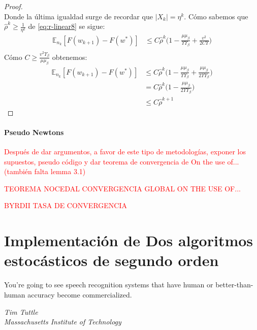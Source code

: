 \documentclass{book}
\theoremstyle{plain}
\theoremstyle{definition}
\theoremstyle{remark}
\begin{document}
\begin{proof}
\begin{equation}
\end{equation}
Donde la última igualdad surge de recordar que $|X_k|=\eta^k$. Cómo sabemos que $\hat{\rho}^k \geq \frac{1}{\eta^k}$ de \ref{eq:r-linear8} se sigue:
\begin{equation}\label{eq:r-linear9}
    \begin{split}
        \mathbb{E}_{n_k}[F(w_{k+1})- F(w^*)] & \leq C\hat{\rho}^k\bigg(1 -\frac{\mu\mu_\beta}{\Upsilon\Upsilon_\beta}+ \frac{v^2}{2C\Upsilon}\bigg)\\
    \end{split}
\end{equation}
Cómo $C \geq \frac{v^2\Upsilon_\beta}{\mu\mu_\beta}$ obtenemos:
\begin{equation}\label{eq:r-linear8}
    \begin{split}
        \mathbb{E}_{n_k}[F(w_{k+1})- F(w^*)] & \leq C\hat{\rho}^k\bigg(1 -\frac{\mu\mu_\beta}{\Upsilon\Upsilon_\beta}+\frac{\mu\mu_\beta}{2\Upsilon\Upsilon_\beta}\bigg)\\
         & = C\hat{\rho}^k\bigg(1 -\frac{\mu\mu_\beta}{2\Upsilon\Upsilon_\beta}\bigg)\\
         & \leq C\hat{\rho}^{k+1}
    \end{split}
\end{equation}




\end{proof}



\subsubsection{Pseudo Newtons}

\textcolor{red}{Después de dar argumentos, a favor de este tipo de metodologías, exponer los supuestos, pseudo código y dar teorema de convergencia de On the use of... (también falta lemma 3.1)}

\textcolor{red}{TEOREMA NOCEDAL CONVERGENCIA GLOBAL ON THE USE OF...}

\textcolor{red}{BYRDII TASA DE CONVERGENCIA}


\chapter{Implementación de Dos algoritmos estocásticos de segundo orden}


\epigraph{You're going to see speech recognition systems that have human or better-than-human accuracy become commercialized.}{\textit{Tim Tuttle \\ Massachusetts Institute of Technology}}
\end{document}
